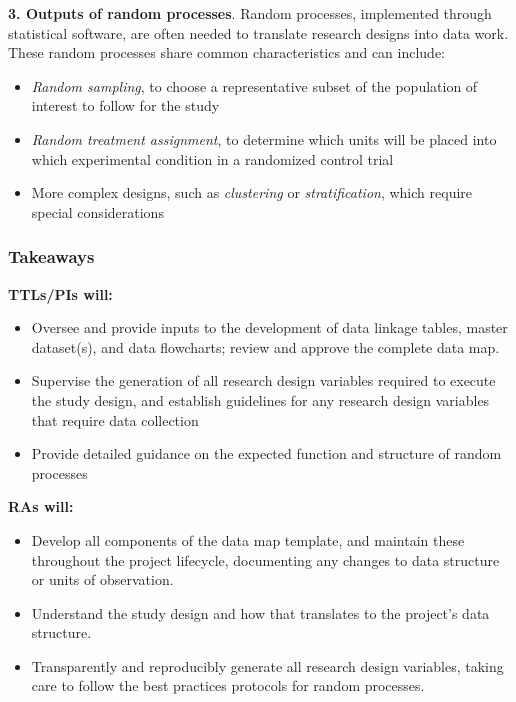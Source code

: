 \documentclass[
]{book}
\providecommand{\tightlist}{%
  \setlength{\itemsep}{0pt}\setlength{\parskip}{0pt}}
\begin{document}
\begin{summary}
\textbf{3. Outputs of random processes}. Random processes, implemented through statistical software, are often needed to translate research designs into data work. These random processes share common characteristics and can include:

\begin{itemize}
\tightlist
\item
  \emph{Random sampling}, to choose a representative subset of the population of interest to follow for the study
\item
  \emph{Random treatment assignment}, to determine which units will be placed into which experimental condition in a randomized control trial
\item
  More complex designs, such as \emph{clustering} or \emph{stratification}, which require special considerations
\end{itemize}

\hypertarget{takeaways-2}{%
\subsubsection*{Takeaways}\label{takeaways-2}}

\textbf{TTLs/PIs will:}

\begin{itemize}
\tightlist
\item
  Oversee and provide inputs to the development of data linkage tables, master dataset(s), and data flowcharts; review and approve the complete data map.
\item
  Supervise the generation of all research design variables required to execute the study design, and establish guidelines for any research design variables that require data collection
\item
  Provide detailed guidance on the expected function and structure of random processes
\end{itemize}

\textbf{RAs will:}

\begin{itemize}
\tightlist
\item
  Develop all components of the data map template, and maintain these throughout the project lifecycle, documenting any changes to data structure or units of observation.
\item
  Understand the study design and how that translates to the project's data structure.
\item
  Transparently and reproducibly generate all research design variables, taking care to follow the best practices protocols for random processes.
\end{itemize}


\end{summary}
\end{document}
